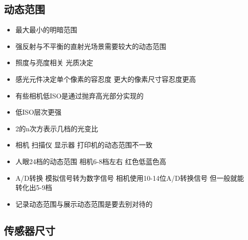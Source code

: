 \documentclass[
  letterpaper,
  DIV=11,
  numbers=noendperiod]{scrreprt}
\providecommand{\tightlist}{%
  \setlength{\itemsep}{0pt}\setlength{\parskip}{0pt}}\usepackage{longtable,booktabs,array}
\begin{document}
\subsection{动态范围}\label{ux52a8ux6001ux8303ux56f4}

\begin{itemize}
\tightlist
\item
  最大最小的明暗范围
\item
  强反射与不平衡的直射光场景需要较大的动态范围
\item
  照度与亮度相关 光质决定
\item
  感光元件决定单个像素的容忍度 更大的像素尺寸容忍度更高
\item
  有些相机低ISO是通过抛弃高光部分实现的
\item
  低ISO层次更强
\item
  2的n次方表示几档的光变比
\item
  相机 扫描仪 显示器 打印机的动态范围不一致
\item
  人眼24档的动态范围 相机6-8档左右 红色低蓝色高
\item
  A/D转换 模拟信号转为数字信号 相机使用10-14位A/D转换信号
  但一般就能转化出5-9档
\item
  记录动态范围与展示动态范围是要去别对待的
\end{itemize}

\subsection{传感器尺寸}\label{ux4f20ux611fux5668ux5c3aux5bf8}
\end{document}
